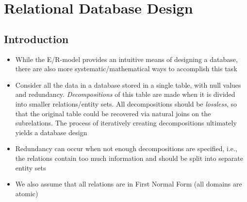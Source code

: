 \documentclass[a4paper]{article}
\begin{document}
\section{Relational Database Design}
\subsection{Introduction}
\begin{itemize}
\item While the E/R-model provides an intuitive means of designing a database, there are also more systematic/mathematical ways to accomplish this task
\item Consider all the data in a database stored in a single table, with null values and redundancy. \emph{Decompositions} of this table are made when it is divided into smaller relations/entity sets. All decompositions should be \emph{lossless}, so that the original table could be recovered via natural joins on the subrelations. The process of iteratively creating decompositions ultimately yields a database design
\item Redundancy can occur when not enough decompositions are specified, i.e., the relations contain too much information and should be split into separate entity sets
\item We also assume that all relations are in First Normal Form (all domains are atomic)
\end{itemize}
\end{document}
